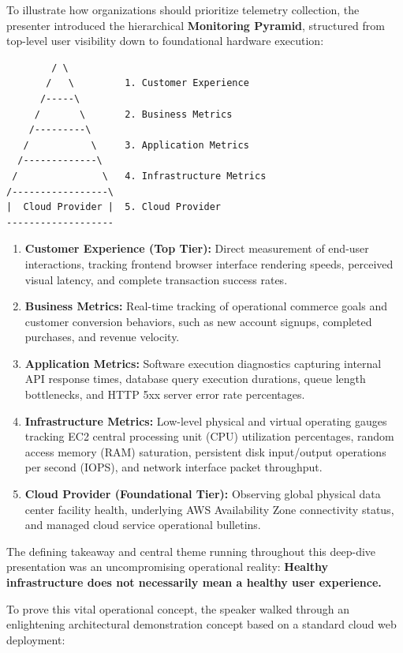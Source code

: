 To illustrate how organizations should prioritize telemetry collection,
the presenter introduced the hierarchical \textbf{Monitoring Pyramid},
structured from top-level user visibility down to foundational hardware
execution:

\begin{verbatim}
        / \
       /   \         1. Customer Experience
      /-----\
     /       \       2. Business Metrics
    /---------\
   /           \     3. Application Metrics
  /-------------\
 /               \   4. Infrastructure Metrics
/-----------------\
|  Cloud Provider |  5. Cloud Provider
-------------------
\end{verbatim}

\begin{enumerate}
\def\labelenumi{\arabic{enumi}.}
\tightlist
\item
  \textbf{Customer Experience (Top Tier):} Direct measurement of
  end-user interactions, tracking frontend browser interface rendering
  speeds, perceived visual latency, and complete transaction success
  rates.
\item
  \textbf{Business Metrics:} Real-time tracking of operational commerce
  goals and customer conversion behaviors, such as new account signups,
  completed purchases, and revenue velocity.
\item
  \textbf{Application Metrics:} Software execution diagnostics capturing
  internal API response times, database query execution durations, queue
  length bottlenecks, and HTTP 5xx server error rate percentages.
\item
  \textbf{Infrastructure Metrics:} Low-level physical and virtual
  operating gauges tracking EC2 central processing unit (CPU)
  utilization percentages, random access memory (RAM) saturation,
  persistent disk input/output operations per second (IOPS), and network
  interface packet throughput.
\item
  \textbf{Cloud Provider (Foundational Tier):} Observing global physical
  data center facility health, underlying AWS Availability Zone
  connectivity status, and managed cloud service operational bulletins.
\end{enumerate}

The defining takeaway and central theme running throughout this
deep-dive presentation was an uncompromising operational reality:
\textbf{Healthy infrastructure does not necessarily mean a healthy user
experience.}

To prove this vital operational concept, the speaker walked through an
enlightening architectural demonstration concept based on a standard
cloud web deployment:

